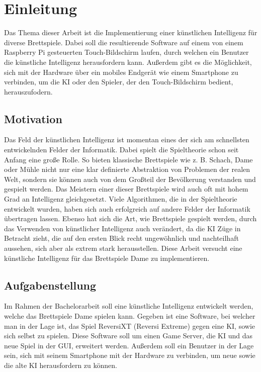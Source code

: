 \documentclass[12pt,a4paper,bibliography=totocnumbered,listof=totocnumbered]{article}
\begin{document}
\section{Einleitung}
Das Thema dieser Arbeit ist die Implementierung einer künstlichen Intelligenz für diverse
Brettspiele. Dabei soll die resultierende Software auf einem von einem Raspberry Pi gesteuerten 
Touch-Bildschirm laufen, durch welchen ein Benutzer die künstliche Intelligenz herausfordern kann.
Außerdem gibt es die Möglichkeit, sich mit der Hardware über ein mobiles Endgerät wie einem 
Smartphone zu verbinden, um die KI oder den Spieler, der den Touch-Bildschirm bedient,
herauszufodern.

\subsection{Motivation}
Das Feld der künstlichen Intelligenz ist momentan eines der sich am schnellsten 
entwickelnden Felder der Informatik. Dabei spielt die Spieltheorie schon seit Anfang eine 
große Rolle. So bieten klassische Brettspiele wie z. B. Schach, Dame oder Mühle nicht nur 
eine klar definierte Abstraktion von Problemen der realen Welt, sondern sie können auch von
dem Großteil der Bevölkerung verstanden und gespielt werden. Das Meistern einer dieser 
Brettspiele wird auch oft mit hohem Grad an Intelligenz gleichgesetzt. Viele Algorithmen,
die in der Spieltheorie entwickelt wurden, haben sich auch erfolgreich auf andere Felder
der Informatik übertragen lassen. Ebenso hat sich die Art, wie Brettspiele gespielt werden, 
durch das Verwenden von künstlicher Intelligenz auch verändert, da die KI Züge in Betracht 
zieht, die auf den ersten Blick recht ungewöhnlich und nachteilhaft aussehen, sich aber als 
extrem stark herausstellen. Diese Arbeit versucht eine künstliche Intelligenz für das
Brettspiele Dame zu implementieren.

\subsection{Aufgabenstellung}
\label{chap:Aufgabenstellung}
Im Rahmen der Bachelorarbeit soll eine künstliche Intelligenz entwickelt werden, welche 
das Brettspiele Dame spielen kann. Gegeben ist eine Software, bei welcher man in der Lage ist,
das Spiel ReversiXT (Reversi Extreme) gegen eine KI, sowie sich selbst zu spielen. Diese 
Software soll um einen Game Server, die KI und das neue Spiel in der GUI, erweitert werden.
Außerdem soll ein Benutzer in der Lage sein, sich mit seinem Smartphone mit der Hardware zu 
verbinden, um neue sowie die alte KI herausfordern zu können.
\end{document}
